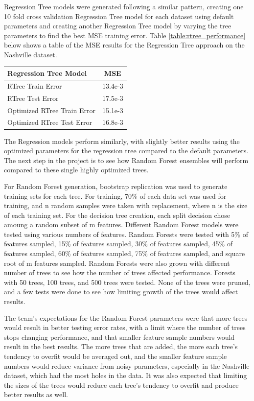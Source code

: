 \documentclass[10pt]{article}
\begin{document}
\begin{multicols}{2}
		Regression Tree models were generated following a similar pattern, creating one 10 fold cross validation Regression Tree model for each dataset using default parameters and creating another Regression Tree model by varying the tree parameters to find the best MSE training error. Table \ref{table:rtree_performance} below shows a table of the MSE results for the Regression Tree approach on the Nashville dataset. 

		\begin{center}
		\captionsetup{type=table}
			\begin{tabular}{l|c}
				Regression Tree Model & MSE \\
				\hline
				RTree Train Error & 13.4e-3 \\
				RTree Test Error & 17.5e-3 \\
				Optimized RTree Train Error & 15.1e-3 \\
				Optimized RTree Test Error & 16.8e-3 \\
			\end{tabular}
			\label{table:rtree_performance}        
		\end{center}
	
		The Regression models perform similarly, with slightly better results using the optimized parameters for the regression tree compared to the default parameters. The next step in the project is to see how Random Forest ensembles will perform compared to these single highly optimized trees.

		For Random Forest generation, bootstrap replication was used to generate training sets for each tree. For training, 70\% of each data set was used for training, and n random samples were taken with replacement, where n is the size of each training set. For the decision tree creation, each split decision chose amoung a random subset of m features. Different Random Forest models were tested using various numbers of features. Random Forests were tested with 5\% of features sampled, 15\% of features sampled, 30\% of features sampled, 45\% of features sampled, 60\% of features sampled, 75\% of features sampled, and square root of m features sampled. Random Forests were also grown with different number of trees to see how the number of trees affected performance. Forests with 50 trees, 100 trees, and 500 trees were tested. None of the trees were pruned, and a few tests were done to see how limiting growth of the trees would affect results. 

		The team's expectations for the Random Forest parameters were that more trees would result in better testing error rates, with a limit where the number of trees stops changing performance, and that smaller feature sample numbers would result in the best results. The more trees that are added, the more each tree's tendency to overfit would be averaged out, and the smaller feature sample numbers would reduce variance from noisy parameters, especially in the Nashville dataset, which had the most holes in the data. It was also expected that limiting the sizes of the trees would reduce each tree's tendency to overfit and produce better results as well. 


\end{multicols}
\end{document}
